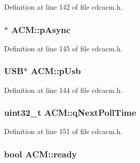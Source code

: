 \-Definition at line 142 of file cdcacm.\-h.

\hypertarget{class_a_c_m_a3f160c6c757994f0c30bd5c5f1fb9d95}{
\subsubsection[{p\-Async}]{$\ast$ {\bf \-A\-C\-M\-::p\-Async}}}\label{class_a_c_m_a3f160c6c757994f0c30bd5c5f1fb9d95}


\-Definition at line 145 of file cdcacm.\-h.

\hypertarget{class_a_c_m_ae403b0129d7beda921de9d9586b597f7}{
\subsubsection[{p\-Usb}]{\setlength{\rightskip}{0pt plus 5cm}\-U\-S\-B$\ast$ {\bf \-A\-C\-M\-::p\-Usb}}}\label{class_a_c_m_ae403b0129d7beda921de9d9586b597f7}


\-Definition at line 144 of file cdcacm.\-h.

\hypertarget{class_a_c_m_a6701d70ae4734e8a81971d9fb8b085f2}{
\subsubsection[{q\-Next\-Poll\-Time}]{\setlength{\rightskip}{0pt plus 5cm}uint32\-\_\-t {\bf \-A\-C\-M\-::q\-Next\-Poll\-Time}}}\label{class_a_c_m_a6701d70ae4734e8a81971d9fb8b085f2}


\-Definition at line 151 of file cdcacm.\-h.

\hypertarget{class_a_c_m_a8ebf4b872b0ed66e93b4ed39f46290fd}{
\subsubsection[{ready}]{\setlength{\rightskip}{0pt plus 5cm}bool {\bf \-A\-C\-M\-::ready}}}\label{class_a_c_m_a8ebf4b872b0ed66e93b4ed39f46290fd}


